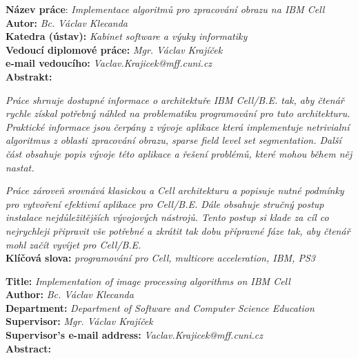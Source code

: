 \raggedbottom


\noindent
\textbf{Název práce}: \textit{Implementace algoritmů pro zpracování obrazu na IBM Cell} \\
\textbf{Autor:} \textit{Bc. Václav Klecanda} \\
\textbf{Katedra (ústav):} \textit{Kabinet software a výuky informatiky} \\
\textbf{Vedoucí diplomové práce:} \textit{Mgr. Václav Krajíček} \\
\textbf{e-mail vedoucího:} \textit{Vaclav.Krajicek@mff.cuni.cz} \\
\textbf{Abstrakt:} \\

\par
\noindent
\textit{
Práce shrnuje dostupné informace o architektuře IBM Cell/B.E. tak, aby čtenář rychle získal potřebný náhled na problematiku programování pro tuto architekturu.
Praktické informace jsou čerpány z vývoje aplikace která implementuje netrivialní algoritmus z oblasti zpracování obrazu, sparse field level set segmentation.
Další část obsahuje popis vývoje této aplikace a řešení problémů, které mohou během něj nastat.
}\\
\par
\noindent
\textit{
Práce zároveň srovnává klasickou a Cell architekturu a popisuje nutné podmínky pro vytvoření efektivní aplikace pro Cell/B.E.
Dále obsahuje stručný postup instalace nejdůležitějších vývojových nástrojů.
Tento postup si klade za cíl co nejrychleji připravit vše potřebné a zkrátit tak dobu přípravné fáze tak, aby čtenář mohl začít vyvíjet pro Cell/B.E.
}\\

\noindent
\textbf{Klíčová slova:} \textit{programování pro Cell, multicore acceleration, IBM, PS3} \\

\pagebreak


\noindent
\textbf{Title:} \textit{Implementation of image processing algorithms on IBM Cell} \\
\textbf{Author:} \textit{Bc. Václav Klecanda} \\
\textbf{Department:} \textit{Department of Software and Computer Science Education} \\
\textbf{Supervisor:} \textit{Mgr. Václav Krajíček} \\
\textbf{Supervisor's e-mail address:} \textit{Vaclav.Krajicek@mff.cuni.cz} \\
\textbf{Abstract:} \\

